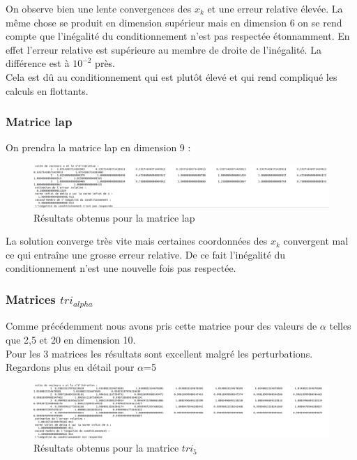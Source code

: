 \documentclass[12,french]{report}
\begin{document}
On observe bien une lente convergences des $x_{k}$ et une erreur relative élevée. La même chose se produit en dimension supérieur mais en dimension 6 on se rend compte que l'inégalité du conditionnement n'est pas respectée étonnamment. En effet l'erreur relative est supérieure au membre de droite de l'inégalité. La différence est à $10^{-2}$ près.\\
Cela est dû au conditionnement qui est plutôt élevé et qui rend compliqué les calculs en flottants.

\subsubsection{Matrice lap} 

On prendra la matrice lap en dimension 9 :\\

\begin{figure}[H]
	\centering
	\includegraphics[width=1\textwidth]{./Images/lap_1.res}
	\caption{Résultats obtenus pour la matrice lap}
\end{figure}

La solution converge très vite mais certaines coordonnées des $x_{k}$ convergent mal ce qui entraîne une grosse erreur relative. De ce fait l'inégalité du conditionnement n'est une nouvelle fois pas respectée.

\subsubsection{Matrices $tri_{alpha}$}

Comme précédemment nous avons pris cette matrice pour des valeurs de $\alpha$ telles que 2,5 et 20 en dimension 10.\\
Pour les 3 matrices les résultats sont excellent malgré les perturbations.\\
Regardons plus en détail pour $\alpha$=5

\begin{figure}[H]
	\centering
	\includegraphics[width=1\textwidth]{./Images/tri_5_1.res}
	\caption{Résultats obtenus pour la matrice $tri_{5}$}
\end{figure}
\end{document}
